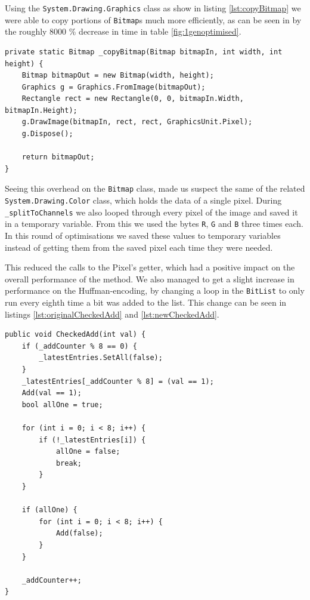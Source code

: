 Using the \lstinline|System.Drawing.Graphics| class as show in listing \ref{lst:copyBitmap} we were able to copy portions of \lstinline|Bitmap|s much more efficiently, \citep{MSDNBitmap} as can be seen in by the roughly 8000 \% decrease in time in table \ref{fig:1genoptimised}.


\begin{lstlisting}[firstnumber=684,label=lst:copyBitmap,caption={Copying a \lstinline|Bitmap| using the \lstinline|Graphics| class. \textbf{File:} first\textunderscore  round/JPEGImage.cs.}]
private static Bitmap _copyBitmap(Bitmap bitmapIn, int width, int height) {
    Bitmap bitmapOut = new Bitmap(width, height);
    Graphics g = Graphics.FromImage(bitmapOut);
    Rectangle rect = new Rectangle(0, 0, bitmapIn.Width, bitmapIn.Height);
    g.DrawImage(bitmapIn, rect, rect, GraphicsUnit.Pixel);
    g.Dispose();

    return bitmapOut;
}
\end{lstlisting}

Seeing this overhead on the \lstinline|Bitmap| class, made us suspect the same of the related \lstinline|System.Drawing.Color| class, which holds the data of a single pixel.
During \lstinline|_splitToChannels| we also looped through every pixel of the image and saved it in a temporary variable. 
From this we used the bytes \lstinline|R|, \lstinline|G| and \lstinline|B| three times each. 
In this round of optimisations we saved these values to temporary variables instead of getting them from the saved pixel each time they were needed.

This reduced the calls to the Pixel's getter, which had a positive impact on the overall performance of the method.
We also managed to get a slight increase in performance on the Huffman-encoding, by changing a loop in the \lstinline|BitList| to only run every eighth time a bit was added to the list.
This change can be seen in listings \ref{lst:originalCheckedAdd} and \ref{lst:newCheckedAdd}.

\begin{lstlisting}[firstnumber=85,label=lst:originalCheckedAdd, caption={Original \lstinline|CheckedAdd| in \lstinline|BitList|. Note the for-loop on line 93. It always runs. \textbf{File:} unoptimized/BitList.cs.}]
public void CheckedAdd(int val) {
    if (_addCounter % 8 == 0) {
        _latestEntries.SetAll(false);
    }
    _latestEntries[_addCounter % 8] = (val == 1);
    Add(val == 1);
    bool allOne = true;

    for (int i = 0; i < 8; i++) {
        if (!_latestEntries[i]) {
            allOne = false;
            break;
        }
    }

    if (allOne) {
        for (int i = 0; i < 8; i++) {
            Add(false);
        }
    }

    _addCounter++;
}
\end{lstlisting}

